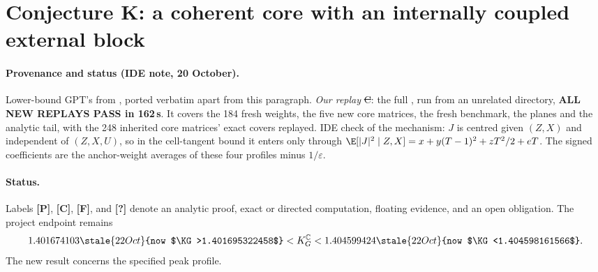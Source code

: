 \section{Conjecture K: a coherent core with an internally coupled external block}
\label{ch:block-gluing-20261020}

\paragraph{Provenance and status (IDE note, 20 October).} Lower-bound GPT's  from , ported verbatim
apart from this paragraph. \emph{Our replay} \st{C}: the full , run from an unrelated directory, \textbf{ALL NEW REPLAYS PASS in 162\,s}. It covers the 184 fresh
weights, the five new core matrices, the fresh benchmark, the planes and the analytic tail, with the 248 inherited core matrices' exact covers replayed. IDE check of the mechanism: $J$ is centred given
$(Z,X)$ and independent of $(Z,X,U)$, so in the cell-tangent bound it enters only through $\E[|J|^2\mid Z,X]=x+y(T-1)^2+zT^2/2+eT$. The signed coefficients are the anchor-weight averages of these
four profiles minus $1/\varepsilon$.


\paragraph{Status.}
Labels \textbf{[P]}, \textbf{[C]}, \textbf{[F]}, and \textbf{[?]} denote an
analytic proof, exact or directed computation, floating evidence, and an open
obligation. The project endpoint remains
\[
1.401674103\stale{22 Oct}{now $\KG>1.401695322458$}<K_G^{\mathbb C}<1.404599424\stale{22 Oct}{now $\KG<1.404598161566$}.
\]
The new result concerns the specified peak profile.


